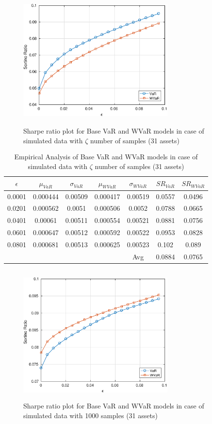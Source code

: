 \documentclass[12pt]{article}
\numberwithin{equation}{section}
\begin{document}
\begin{figure}[!h]
\centering
\includegraphics[height=7.0cm,width=0.7\textwidth]{VaR/bse30_simulated/sr_exact_cheb.eps}
\caption{Sharpe ratio plot for Base VaR and WVaR models in case of simulated data with $\zeta$ number of samples (31 assets)}
\label{fig:5.2}
\end{figure}


\begin{table}[!h]
\centering
\captionsetup{justification=centering}
\begin{tabular}{||c|c|c|c|c|c|c||}
\hline
$\epsilon$ & $\mu_{VaR}$ & $\sigma_{VaR}$ & $\mu_{WVaR}$ & $\sigma_{WVaR}$ & $SR_{VaR}$ & $SR_{WVaR}$\\
\hline
0.0001 & 0.000444 & 0.00509 & 0.000417 & 0.00519 & 0.0557 & 0.0496 \\
0.0201 & 0.000562 & 0.0051 & 0.000506 & 0.0052 & 0.0788 & 0.0665 \\
0.0401 & 0.00061 & 0.00511 & 0.000554 & 0.00521 & 0.0881 & 0.0756 \\
0.0601 & 0.000647 & 0.00512 & 0.000592 & 0.00522 & 0.0953 & 0.0828 \\
0.0801 & 0.000681 & 0.00513 & 0.000625 & 0.00523 & 0.102 & 0.089 \\
\hline
& & & & Avg & 0.0884 & 0.0765 \\
\hline
\end{tabular}
\caption{Empirical Analysis of Base VaR and WVaR models in case of simulated data with $\zeta$ number of samples (31 assets)}
\label{tab:5.2}
\end{table}

\begin{figure}[!h]
\centering
\includegraphics[height=7.0cm,width=0.7\textwidth]{VaR/bse30_simulated/sr_1000_cheb.eps}
\caption{Sharpe ratio plot for Base VaR and WVaR models in case of simulated data with 1000 samples (31 assets)}
\label{fig:5.3}
\end{figure}
\end{document}
